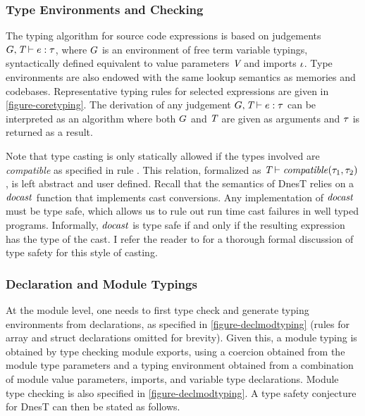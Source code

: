 \subsubsection{Type Environments and Checking}

The typing algorithm for source code expressions is based on judgements $G,\textit{T} \vdash e
: \tau$, where $G$ is an environment of free term variable typings, syntactically defined
equivalent to value parameters $\textit{V}$ and imports $\iota$. Type environments are also
endowed with the same lookup semantics as memories and codebases. Representative typing rules
for selected expressions are given in \autoref{figure-coretyping}. The derivation of any
judgement $G,\textit{T} \vdash e : \tau$ can be interpreted as an algorithm where both $G$
and $\textit{T}$ are given as arguments and $\tau$ is returned as a result.

\coretypingfig

Note that type casting is only statically allowed if the types involved are \emph{compatible} as
specified in rule . This relation, formalized as $\textit{T} \vdash
\mathit{compatible}(\tau_1,\tau_2)$, is left abstract and user defined. Recall that the semantics of DnesT
relies on a $\mathit{docast}$ function that implements cast conversions. Any implementation of
$\mathit{docast}$ must be type safe, which allows us to rule out run time cast failures in well
typed programs. Informally, $\mathit{docast}$ is type safe if and only if the resulting
expression has the type of the cast. I refer the reader to \cite{FramedML} for a thorough formal
discussion of type safety for this style of casting.

\subsubsection{Declaration and Module Typings}

At the module level, one needs to first type check and generate typing environments from
declarations, as specified in \autoref{figure-declmodtyping} (rules for array and struct
declarations omitted for brevity). Given this, a module typing is obtained by type checking
module exports, using a coercion obtained from the module type parameters and a typing
environment obtained from a combination of module value parameters, imports, and variable type
declarations. Module type checking is also specified in \autoref{figure-declmodtyping}. A type
safety conjecture for DnesT can then be stated as follows.


